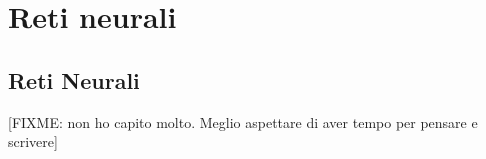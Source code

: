 \chapter{Reti neurali}
\section{Reti Neurali}
[FIXME: non ho capito molto. Meglio aspettare di aver tempo per pensare e scrivere]
